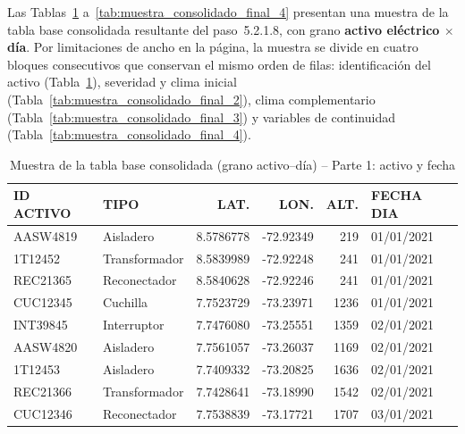 Las Tablas~\ref{tab:muestra_consolidado_final_1} a~\ref{tab:muestra_consolidado_final_4} presentan una muestra de la tabla base consolidada resultante del paso~5.2.1.8, con grano \textbf{activo eléctrico $\times$ día}. Por limitaciones de ancho en la página, la muestra se divide en cuatro bloques consecutivos que conservan el mismo orden de filas: identificación del activo (Tabla~\ref{tab:muestra_consolidado_final_1}), severidad y clima inicial (Tabla~\ref{tab:muestra_consolidado_final_2}), clima complementario (Tabla~\ref{tab:muestra_consolidado_final_3}) y variables de continuidad (Tabla~\ref{tab:muestra_consolidado_final_4}).

\begin{table}[H]
\centering
\small
\caption{Muestra de la tabla base consolidada (grano activo--día) -- Parte 1: activo y fecha}
\label{tab:muestra_consolidado_final_1}
\begin{tabular}{l l r r r l}
\toprule
\textbf{ID ACTIVO} & \textbf{TIPO} & \textbf{LAT.} & \textbf{LON.} & \textbf{ALT.} & \textbf{FECHA DIA} \\
\midrule
AASW4819 & Aisladero      & 8.5786778 & -72.92349 & 219  & 01/01/2021 \\
1T12452  & Transformador  & 8.5839989 & -72.92248 & 241  & 01/01/2021 \\
REC21365 & Reconectador   & 8.5840628 & -72.92246 & 241  & 01/01/2021 \\
CUC12345 & Cuchilla       & 7.7523729 & -73.23971 & 1236 & 01/01/2021 \\
INT39845 & Interruptor    & 7.7476080 & -73.25551 & 1359 & 02/01/2021 \\
AASW4820 & Aisladero      & 7.7561057 & -73.26037 & 1169 & 02/01/2021 \\
1T12453  & Aisladero      & 7.7409332 & -73.20825 & 1636 & 02/01/2021 \\
REC21366 & Transformador  & 7.7428641 & -73.18990 & 1542 & 02/01/2021 \\
CUC12346 & Reconectador   & 7.7538839 & -73.17721 & 1707 & 03/01/2021 \\
\bottomrule
\end{tabular}
\end{table}

